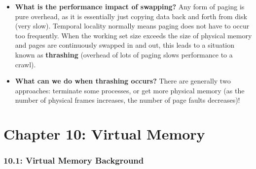 \documentclass[12pt]{article}
\begin{document}
\begin{itemize}
    \item \textbf{What is the performance impact of swapping?} Any form of paging is pure overhead, as it is essentially just copying data back and forth from disk (very slow). Temporal locality normally means paging does not have to occur too frequently. When the working set size exceeds the size of physical memory and pages are continuously swapped in and out, this leads to a situation known as \textbf{thrashing} (overhead of lots of paging slows performance to a crawl).
    \item \textbf{What can we do when thrashing occurs?} There are generally two approaches: terminate some processes, or get more physical memory (as the number of physical frames increases, the number of page faults decreases)!
\end{itemize}

\part*{Chapter 10: Virtual Memory}

\section*{10.1: Virtual Memory Background}
\end{document}
